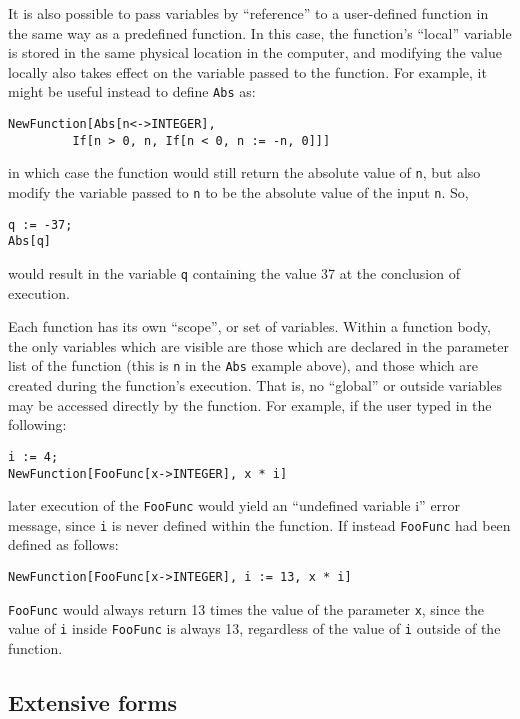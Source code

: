 It is also possible to pass variables by ``reference'' to a user-defined
function in the same way as a predefined function.  In this case, the
function's ``local'' variable is stored in the same physical location in the
computer, and modifying the value locally also takes effect on the variable
passed to the function.  For example, it might
be useful instead to define \verb+Abs+ as:

\begin{verbatim}
NewFunction[Abs[n<->INTEGER],
		 If[n > 0, n, If[n < 0, n := -n, 0]]]
\end{verbatim}

\noindent in which case the function would still return the absolute value
of \verb+n+, but also modify the variable passed to \verb+n+ to be the
absolute value of the input \verb+n+.  So,

\begin{verbatim}
q := -37;
Abs[q]
\end{verbatim}

\noindent would result in the variable \verb+q+ containing the value 37
at the conclusion of execution.

Each function has its own ``scope'', or set of variables.  Within a function
body, the only variables which are visible are those which are declared
in the parameter list of the function (this is \verb+n+ in the \verb+Abs+
example above), and those which are created during the function's execution.
That is, no ``global'' or outside variables may be accessed directly by the
function.  For example, if the user typed in the following:

\begin{verbatim}
i := 4;
NewFunction[FooFunc[x->INTEGER], x * i]
\end{verbatim}

\noindent later execution of the \verb+FooFunc+ would yield an ``undefined
variable i'' error message, since \verb+i+ is never defined within the
function.  If instead \verb+FooFunc+ had been defined as follows:

\begin{verbatim}
NewFunction[FooFunc[x->INTEGER], i := 13, x * i]
\end{verbatim}

\noindent \verb+FooFunc+ would always return 13 times the value of the
parameter \verb+x+, since the value of \verb+i+ inside \verb+FooFunc+ is
always 13, regardless of the value of \verb+i+ outside of the function.


\subsection{Extensive forms}

